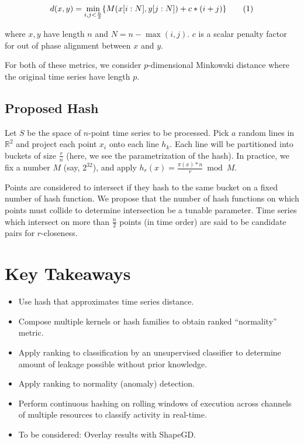 \documentclass[a4paper]{article}
\newcommand\numberthis{\addtocounter{equation}{1}\tag{\theequation}}
\begin{document}
\begin{align*}
    d(x,y) = \min\limits_{i,j<\frac{n}{2}} \{ M(x[i:N],y[j:N]) + c*(i+j) \} \numberthis \\
\end{align*}

where $x,y$ have length $n$ and $N = n - \max(i,j)$.
$c$ is a scalar penalty factor for out of phase alignment between $x$ and $y$.

For both of these metrics, we consider $p$-dimensional Minkowski distance where the original time series have length $p$.

\subsection{Proposed Hash}

Let $S$ be the space of $n$-point time series to be processed.
Pick $a$ random lines in $\mathbb{R}^2$ and project each point $x_i$ onto each line $h_k$.
Each line will be partitioned into buckets of size $\frac{r}{n}$ (here, we see the parametrization of the hash).
In practice, we fix a number $M$ (say, $2^{32}$), and apply $h_r(x) = \frac{\pi(x)*n}{r} \bmod M$. 

Points are considered to intersect if they hash to the same bucket on a fixed number of hash function.
We propose that the number of hash functions on which points must collide to determine intersection be a tunable parameter.
Time series which intersect on more than $\frac{n}{2}$ points (in time order) are said to be candidate pairs for $r$-closeness.

\section{Key Takeaways}

\begin{itemize}
    \item Use hash that approximates time series distance.
    \item Compose multiple kernels or hash families to obtain ranked ``normality'' metric.
    \item Apply ranking to classification by an unsupervised classifier to determine amount of leakage possible without prior knowledge.
    \item Apply ranking to normality (anomaly) detection.
    \item Perform continuous hashing on rolling windows of execution across channels of multiple resources to classify activity in real-time.
    \item To be considered: Overlay results with ShapeGD\@.
\end{itemize}



\end{document}
